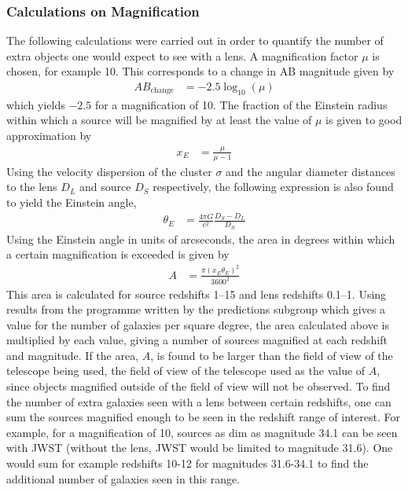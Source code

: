 		\subsubsection{Calculations on Magnification} %
		\label{ssub:calculations_on_magnification}
			The following calculations were carried out in order to quantify the number of extra objects one would expect to see with a lens. A magnification factor $\mu$ is chosen, for example 10. This corresponds to a change in AB magnitude given by
			\begin{align}
				AB_\text{change} &= -2.5\log_{10}(\mu)
			\end{align}
			which yields $-2.5$ for a magnification of 10. The fraction of the Einstein radius within which a source will be magnified by at least the value of $\mu$ is given to good approximation by\cite{Lens_mass_estimate}
			\begin{align}
				x_E &= \frac{\mu}{\mu -1}
			\end{align}
			Using the velocity dispersion of the cluster $\sigma$ and the angular diameter distances to the lens $D_L$ and source $D_S$ respectively, the following expression is also found to yield the Einstein angle,
			\begin{align}
				\theta_E &= \frac{4\pi G}{c^2}\frac{D_S-D_L}{D_S}
			\end{align}
			Using the Einstein angle in units of arcseconds, the area in degrees within which a certain magnification is exceeded is given by
			\begin{align}
				A &= \frac{\pi(x_E \theta_E)^2}{3600^2}
			\end{align}
			This area is calculated for source redshifts 1--15 and lens redshifts 0.1--1. Using results from the programme written by the predictions subgroup which gives a value for the number of galaxies per square degree, the area calculated above is multiplied by each value, giving a number of sources magnified at each redshift and magnitude. If the area, $A$, is found to be larger than the field of view of the telescope being used, the field of view of the telescope used as the value of $A$, since objects magnified outside of the field of view will not be observed. To find the number of extra galaxies seen with a lens between certain redshifts, one can sum the sources magnified enough to be seen in the redshift range of interest. For example, for a magnification of 10, sources as dim as magnitude 34.1 can be seen with JWST (without the lens, JWST would be limited to magnitude 31.6). One would sum for example redshifts 10-12 for magnitudes 31.6-34.1 to find the additional number of galaxies seen in this range.

